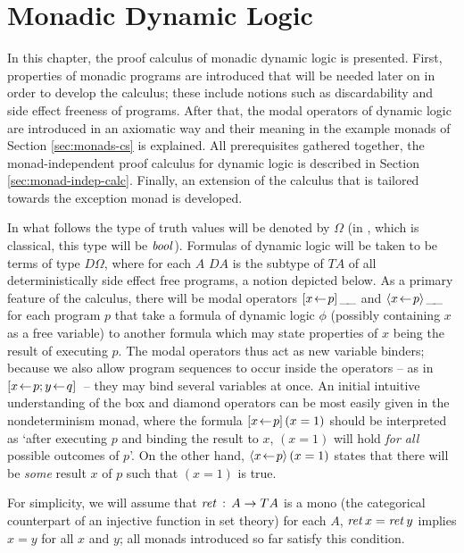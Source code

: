 
\chapter{Monadic Dynamic Logic}
\label{cha:logic}

In this chapter, the proof calculus of monadic dynamic logic is presented.
First, properties of monadic programs are introduced that will be needed later
on in order to develop the calculus; these include notions such as
discardability and side effect freeness of programs. After that, the modal
operators of dynamic logic are introduced in an axiomatic way and their meaning
in the example monads of Section \ref{sec:monads-cs} is explained. All
prerequisites gathered together, the monad-independent proof calculus for
dynamic logic is described in Section \ref{sec:monad-indep-calc}. Finally, an
extension of the calculus that is tailored towards the exception monad is
developed.

In what follows the type of truth values will be denoted by $\Omega$ (in \Isabelle,
which is classical, this type will be $\mathit{bool}$). Formulas of dynamic logic
will be taken to be terms of type $D\Omega$, where for each $A$ $D A$ is the subtype
of $T A$ of all deterministically side effect free programs, a notion depicted
below. As a primary feature of the calculus, there will be modal operators
$[x \!\gets\! p]\,{\_\!\_}$ and $\langle x \!\gets\! p\rangle\,{\_\!\_}$ for each program $p$
that take a formula of dynamic logic $\phi$ (possibly containing $x$ as a free
variable) to another formula which may state properties of $x$ being the result
of executing $p$. The modal operators thus act as new variable binders; because
we also allow program sequences to occur inside the operators -- as in
$[x\!\gets\! p; y\!\gets\! q]\,$ -- they may bind several variables at once. An
initial intuitive understanding of the box and diamond operators can be most
easily given in the nondeterminism monad, where the formula $[x\!\gets\!
  p]\,{(x=1)}$ should be interpreted as `after executing $p$ and binding the
result to $x$, $(x=1)$ will hold \emph{for all} possible outcomes of $p$'. On
the other hand, $\langle x\!\gets\! p\rangle\,{(x=1)}$ states that there will be
\emph{some} result $x$ of $p$ such that $(x=1)$ is true.

For simplicity, we will assume that $\mathit{ret\,} :\, A \to T A$ is a mono (the
categorical counterpart of an injective function in set theory) for each $A$,
\IE $\mathit{ret\,} x = \mathit{ret\,} y$ implies $x = y$ for all $x$ and $y$; all monads introduced
so far satisfy this condition.


